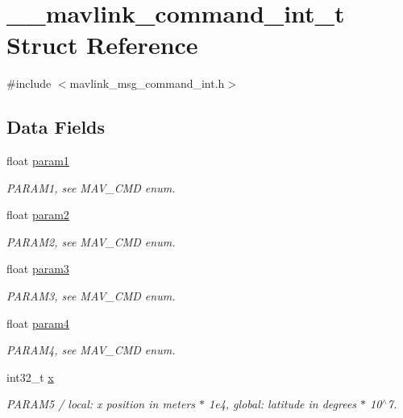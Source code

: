 \hypertarget{struct____mavlink__command__int__t}{\section{\+\_\+\+\_\+mavlink\+\_\+command\+\_\+int\+\_\+t Struct Reference}
\label{struct____mavlink__command__int__t}
}


{\ttfamily \#include $<$mavlink\+\_\+msg\+\_\+command\+\_\+int.\+h$>$}

\subsection*{Data Fields}
\begin{DoxyCompactItemize}
\item 
float \hyperlink{struct____mavlink__command__int__t_a42b467f31f178ee9b8f9d0b7c03f3c97}{param1}
\begin{DoxyCompactList}\small\item\em P\+A\+R\+A\+M1, see M\+A\+V\+\_\+\+C\+M\+D enum. \end{DoxyCompactList}\item 
float \hyperlink{struct____mavlink__command__int__t_ab10e74c14c186f8b416321d5dda78697}{param2}
\begin{DoxyCompactList}\small\item\em P\+A\+R\+A\+M2, see M\+A\+V\+\_\+\+C\+M\+D enum. \end{DoxyCompactList}\item 
float \hyperlink{struct____mavlink__command__int__t_ad799b509430fdc9f7e50c14346e0fae5}{param3}
\begin{DoxyCompactList}\small\item\em P\+A\+R\+A\+M3, see M\+A\+V\+\_\+\+C\+M\+D enum. \end{DoxyCompactList}\item 
float \hyperlink{struct____mavlink__command__int__t_a0b7902944c8468da6e2fea36778994e3}{param4}
\begin{DoxyCompactList}\small\item\em P\+A\+R\+A\+M4, see M\+A\+V\+\_\+\+C\+M\+D enum. \end{DoxyCompactList}\item 
int32\+\_\+t \hyperlink{struct____mavlink__command__int__t_a31099780f7fa0bcbf0a10179279471a2}{x}
\begin{DoxyCompactList}\small\item\em P\+A\+R\+A\+M5 / local\+: x position in meters $\ast$ 1e4, global\+: latitude in degrees $\ast$ 10$^\wedge$7. \end{DoxyCompactList}\item 

\end{DoxyCompactItemize}
